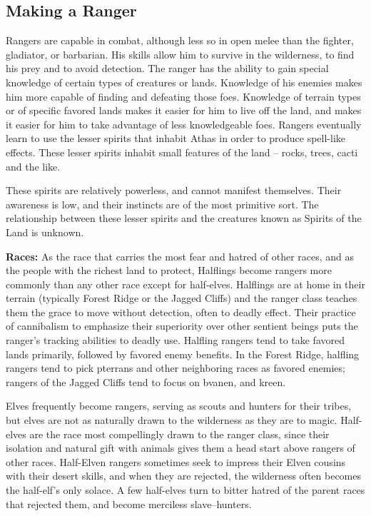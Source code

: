 \subsection{Making a Ranger}

Rangers are capable in combat, although less so in open melee than the fighter, gladiator, or barbarian. His skills allow him to survive in the wilderness, to find his prey and to avoid detection. The ranger has the ability to gain special knowledge of certain types of creatures or lands. Knowledge of his enemies makes him more capable of finding and defeating those foes. Knowledge of terrain types or of specific favored lands makes it easier for him to live off the land, and makes it easier for him to take advantage of less knowledgeable foes. Rangers eventually learn to use the lesser spirits that inhabit Athas in order to produce spell-like effects. These lesser spirits inhabit small features of the land -- rocks, trees, cacti and the like.

These spirits are relatively powerless, and cannot manifest themselves. Their awareness is low, and their instincts are of the most primitive sort. The relationship between these lesser spirits and the creatures known as Spirits of the Land is unknown.

\textbf{Races:} As the race that carries the most fear and hatred of other races, and as the people with the richest land to protect, Halflings become rangers more commonly than any other race except for half-elves. Halflings are at home in their terrain (typically Forest Ridge or the Jagged Cliffs) and the ranger class teaches them the grace to move without detection, often to deadly effect. Their practice of cannibalism to emphasize their superiority over other sentient beings puts the ranger's tracking abilities to deadly use. Halfling rangers tend to take favored lands primarily, followed by favored enemy benefits. In the Forest Ridge, halfling rangers tend to pick pterrans and other neighboring races as favored enemies; rangers of the Jagged Cliffs tend to focus on bvanen, and kreen.

Elves frequently become rangers, serving as scouts and hunters for their tribes, but elves are not as naturally drawn to the wilderness as they are to magic. Half-elves are the race most compellingly drawn to the ranger class, since their isolation and natural gift with animals gives them a head start above rangers of other races. Half-Elven rangers sometimes seek to impress their Elven cousins with their desert skills, and when they are rejected, the wilderness often becomes the half-elf's only solace. A few half-elves turn to bitter hatred of the parent races that rejected them, and become merciless slave--hunters.

